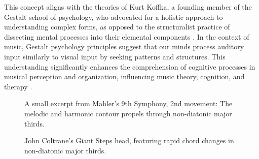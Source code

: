 This concept aligns with the theories of Kurt Koffka, a founding member of the Gestalt school of psychology, who advocated for a holistic approach to understanding complex forms, as opposed to the structuralist practice of dissecting mental processes into their elemental components \cite{Koffka2013PrinciplesPsychology}. In the context of music, Gestalt psychology principles suggest that our minds process auditory input similarly to visual input by seeking patterns and structures. This understanding significantly enhances the comprehension of cognitive processes in musical perception and organization, influencing music theory, cognition, and therapy \cite{Lerdahl1985AMusic}.

\begin{figure}[ht]
    \centering
    \caption[Mahler's 9th Symphony, 2nd movement excerpt.]{\small{A small excerpt from Mahler's 9th Symphony, 2nd movement: The melodic and harmonic contour propels through non-diatonic major thirds.}}
    \label{fig:mahler}
\end{figure}

\begin{figure}[ht]
    \centering
    \caption[Giant Steps excerpt.]{\small{John Coltrane's Giant Steps head, featuring rapid chord changes in non-diatonic major thirds.}}
    \label{fig:giant_steps}
\end{figure}


